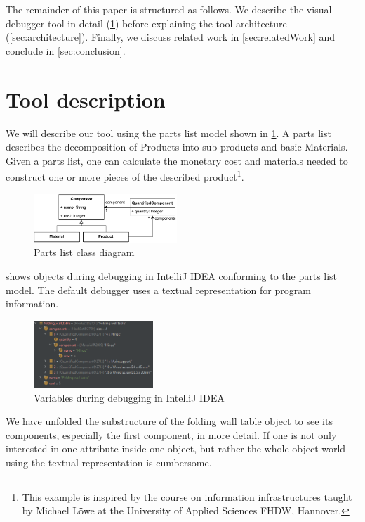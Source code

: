 \documentclass[conference]{IEEEtran}
\newcommand{\intellij}{IntelliJ IDEA}
\begin{document}
The remainder of this paper is structured as follows.
We describe the visual debugger tool in detail (\cref{sec:toolDescription}) before explaining the tool architecture (\cref{sec:architecture}).
Finally, we discuss related work in \cref{sec:relatedWork} and conclude in \cref{sec:conclusion}.

\section{Tool description} \label{sec:toolDescription}
We will describe our tool using the parts list model shown in \cref{fig:partsListModel}.
A parts list describes the decomposition of \textsf{Products} into sub-products and basic \textsf{Materials}.
Given a parts list, one can calculate the monetary cost and materials needed to construct one or more pieces of the described product\footnote{This example is inspired by the course on information infrastructures taught by Michael Löwe at the University of Applied Sciences FHDW, Hannover.}.

\begin{figure}[h]
    \centering
    \includegraphics[width=0.48\textwidth]{images/VD-partsList-classes.pdf}
    \caption{Parts list class diagram}
    \label{fig:partsListModel}
\end{figure}

 shows objects during debugging in \intellij{} conforming to the parts list model. 
The default debugger uses a textual representation for program information.

\begin{figure}[h]
    \centering
    \includegraphics[width=0.4\textwidth]{images/variables.png}
    \caption{Variables during debugging in \intellij}
    \label{fig:variablesIntellij}
\end{figure}

We have unfolded the substructure of the \textsf{folding wall table} object to see its components, especially the first component, in more detail.
If one is not only interested in one attribute inside one object, but rather the whole object world using the textual representation is cumbersome.
\end{document}
